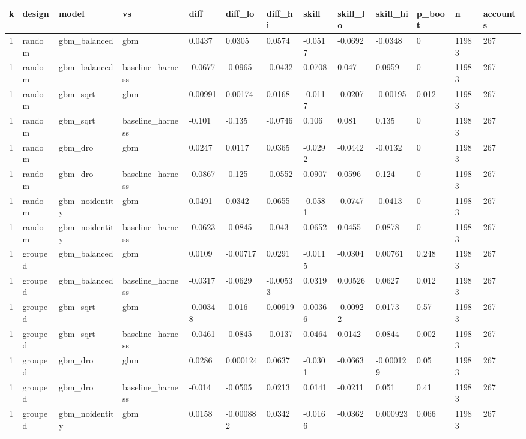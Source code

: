 \begin{tabular}{lllllllllllll}
\toprule
k & design & model & vs & diff & diff\_lo & diff\_hi & skill & skill\_lo & skill\_hi & p\_boot & n & accounts \\
\midrule
1 & random & gbm\_balanced & gbm & 0.0437 & 0.0305 & 0.0574 & -0.0517 & -0.0692 & -0.0348 & 0 & 11983 & 267 \\
1 & random & gbm\_balanced & baseline\_harness & -0.0677 & -0.0965 & -0.0432 & 0.0708 & 0.047 & 0.0959 & 0 & 11983 & 267 \\
1 & random & gbm\_sqrt & gbm & 0.00991 & 0.00174 & 0.0168 & -0.0117 & -0.0207 & -0.00195 & 0.012 & 11983 & 267 \\
1 & random & gbm\_sqrt & baseline\_harness & -0.101 & -0.135 & -0.0746 & 0.106 & 0.081 & 0.135 & 0 & 11983 & 267 \\
1 & random & gbm\_dro & gbm & 0.0247 & 0.0117 & 0.0365 & -0.0292 & -0.0442 & -0.0132 & 0 & 11983 & 267 \\
1 & random & gbm\_dro & baseline\_harness & -0.0867 & -0.125 & -0.0552 & 0.0907 & 0.0596 & 0.124 & 0 & 11983 & 267 \\
1 & random & gbm\_noidentity & gbm & 0.0491 & 0.0342 & 0.0655 & -0.0581 & -0.0747 & -0.0413 & 0 & 11983 & 267 \\
1 & random & gbm\_noidentity & baseline\_harness & -0.0623 & -0.0845 & -0.043 & 0.0652 & 0.0455 & 0.0878 & 0 & 11983 & 267 \\
1 & grouped & gbm\_balanced & gbm & 0.0109 & -0.00717 & 0.0291 & -0.0115 & -0.0304 & 0.00761 & 0.248 & 11983 & 267 \\
1 & grouped & gbm\_balanced & baseline\_harness & -0.0317 & -0.0629 & -0.00533 & 0.0319 & 0.00526 & 0.0627 & 0.012 & 11983 & 267 \\
1 & grouped & gbm\_sqrt & gbm & -0.00348 & -0.016 & 0.00919 & 0.00366 & -0.00922 & 0.0173 & 0.57 & 11983 & 267 \\
1 & grouped & gbm\_sqrt & baseline\_harness & -0.0461 & -0.0845 & -0.0137 & 0.0464 & 0.0142 & 0.0844 & 0.002 & 11983 & 267 \\
1 & grouped & gbm\_dro & gbm & 0.0286 & 0.000124 & 0.0637 & -0.0301 & -0.0663 & -0.000129 & 0.05 & 11983 & 267 \\
1 & grouped & gbm\_dro & baseline\_harness & -0.014 & -0.0505 & 0.0213 & 0.0141 & -0.0211 & 0.051 & 0.41 & 11983 & 267 \\
1 & grouped & gbm\_noidentity & gbm & 0.0158 & -0.000882 & 0.0342 & -0.0166 & -0.0362 & 0.000923 & 0.066 & 11983 & 267 \\

\end{tabular}
